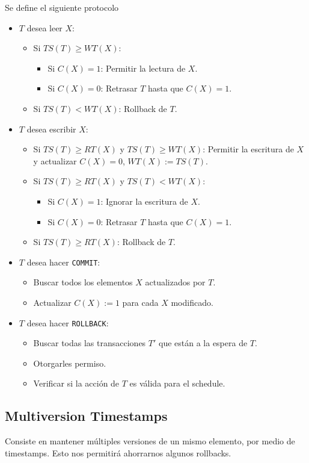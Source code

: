 Se define el siguiente protocolo
\begin{itemize}
  \item $T$ desea leer $X$:
  \begin{itemize}
    \item Si $TS(T) \geq WT(X)$:
    \begin{itemize}
      \item Si $C(X) = 1$: Permitir la lectura de $X$.
      \item Si $C(X) = 0$: Retrasar $T$ hasta que $C(X) = 1$.
    \end{itemize}
    \item Si $TS(T) < WT(X)$: Rollback de $T$.
  \end{itemize}
  \item $T$ desea escribir $X$:
  \begin{itemize}
    \item Si $TS(T) \geq RT(X)$ y $TS(T) \geq WT(X)$: Permitir la escritura de $X$ y actualizar $C(X) = 0$, $WT(X) := TS(T)$.
    \item Si $TS(T) \geq RT(X)$ y $TS(T) < WT(X)$:
    \begin{itemize}
      \item Si $C(X) = 1$: Ignorar la escritura de $X$.
      \item Si $C(X) = 0$: Retrasar $T$ hasta que $C(X) = 1$. 
    \end{itemize}
    \item Si $TS(T) \geq RT(X)$: Rollback de $T$.
  \end{itemize}
  \item $T$ desea hacer \texttt{COMMIT}:
  \begin{itemize}
    \item Buscar todos los elementos $X$ actualizados por $T$.
    \item Actualizar $C(X) := 1$ para cada $X$ modificado.
  \end{itemize}
  \item $T$ desea hacer \texttt{ROLLBACK}:
  \begin{itemize}
    \item Buscar todas las transacciones $T'$ que están a la espera de $T$.
    \item Otorgarles permiso.
    \item Verificar si la acción de $T$ es válida para el schedule.
  \end{itemize}
\end{itemize}

\subsection{Multiversion Timestamps}
Consiste en mantener múltiples versiones de un mismo elemento, por medio de timestamps. Esto nos permitirá ahorrarnos algunos rollbacks.

